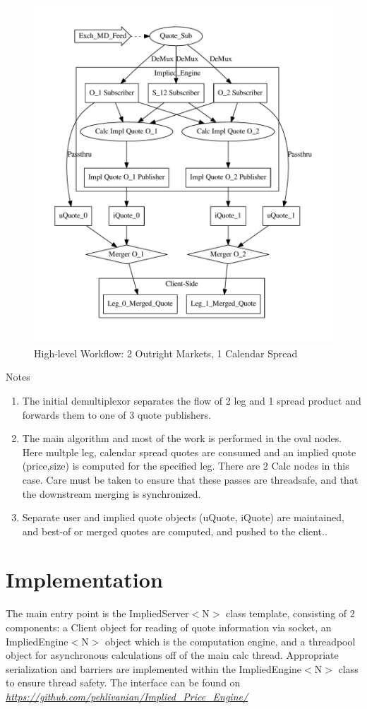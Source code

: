 \documentclass{article}
\begin{document}
\clearpage
\begin{figure}
\centering
\includegraphics[scale=.44]{workflow.pdf}
\caption{High-level Workflow: 2 Outright Markets, 1 Calendar Spread}
\end{figure}

Notes
\begin{enumerate}
\item The initial demultiplexor separates the flow of 2 leg and 1 spread product and forwards them to one of 3 quote publishers.
\item The main algorithm and most of the work is performed in the oval nodes. Here multple leg, calendar spread quotes are consumed and an implied quote (price,size) is computed for the specified leg. There are 2 Calc nodes in this case. Care must be taken to ensure that these passes are threadsafe, and that the downstream merging is synchronized.
\item Separate user and implied quote objects (uQuote, iQuote) are maintained, and best-of or merged quotes are computed, and pushed to the client..
\end{enumerate}

\section*{Implementation}
The main entry point is the ImpliedServer$<$N$>$ class template, consisting of 2 components: a Client object for reading of quote information via socket, an ImpliedEngine$<$N$>$ object which is the computation engine, and a threadpool object for asynchronous calculations off of the main calc thread. Appropriate serialization and barriers are implemented within the ImpliedEngine$<$N$>$ class to ensure thread safety. The interface can be found on \href{https://github.com/pehlivanian/Implied_Price_Engine}{\it https://github.com/pehlivanian/Implied{\_}Price{\_}Engine/}
\end{document}
